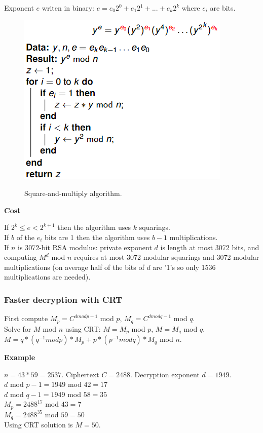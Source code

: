 \documentclass{article}
\begin{document}
Exponent $e$ writen in binary: $e=e_0 2^0 + e_1 2^1 + ... + e_k 2^k$ where $e_i$ are bits.\\

\begin{figure}[H]
\centering
\includegraphics[scale=0.65]{Images/squareandmultiply.png}
\label{fig:fround}
\caption{Square-and-multiply algorithm.}
\end{figure}

\textbf{Cost}

If $2^k \leq e < 2^{k+1}$ then the algorithm uses $k$ squarings.\\
If $b$ of the $e_i$ bits are 1 then the algorithm uses $b-1$ multiplications.\\
If $n$ is 3072-bit RSA modulus: private exponent $d$ is length at most 3072 bits, and computing $M^d$ mod $n$ requires at most 3072 modular squarings and 3072 modular multiplications (on average half of the bits of $d$ are '1's so only 1536 multiplications are needed).

\subsubsection{Faster decryption with CRT}

First compute $M_p = C^{d mod p-1}$ mod $p$, $M_q = C^{d mod q-1}$ mod $q$.\\
Solve for $M$ mod $n$ using CRT: $M=M_p$ mod $p$, $M=M_q$ mod $q$.\\
$M = q * (q^{-1} mod p) * M_p + p * (p^{-1} mod q ) * M_q$ mod $n$.

\textbf{Example}

$n=43*59=2537$. Ciphertext $C=2488$. Decryption exponent $d=1949$.\\
$d$ mod $p-1 = 1949$ mod $42 = 17$\\
$d$ mod $q-1 = 1949$ mod $58 = 35$\\
$M_p = 2488^{17}$ mod $43 = 7$\\
$M_q = 2488^{35}$ mod $59 = 50$\\
Using CRT solution is $M=50$.
\end{document}
